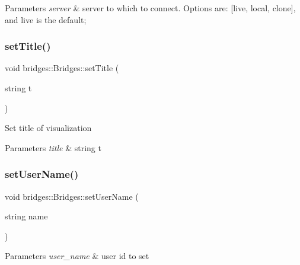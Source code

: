 \begin{DoxyParams}{Parameters}
{\em server} & server to which to connect. Options are\+: \mbox{[}\textquotesingle{}live\textquotesingle{}, \textquotesingle{}local\textquotesingle{}, \textquotesingle{}clone\textquotesingle{}\mbox{]}, and \textquotesingle{}live\textquotesingle{} is the default; \\
\hline
\end{DoxyParams}
\mbox{\label{namespacebridges_1_1_bridges_af36e132d582dabf5ae5ee8b8f26976db}} 
\subsubsection{\texorpdfstring{set\+Title()}{setTitle()}}
{\footnotesize\ttfamily void bridges\+::\+Bridges\+::set\+Title (\begin{DoxyParamCaption}\item[{string}]{t }\end{DoxyParamCaption})}

Set title of visualization


\begin{DoxyParams}{Parameters}
{\em title} & string t \\
\hline
\end{DoxyParams}
\mbox{\label{namespacebridges_1_1_bridges_a383c5c1d3c85541f466e0cb60dde1c29}} 
\subsubsection{\texorpdfstring{set\+User\+Name()}{setUserName()}}
{\footnotesize\ttfamily void bridges\+::\+Bridges\+::set\+User\+Name (\begin{DoxyParamCaption}\item[{string}]{name }\end{DoxyParamCaption})}


\begin{DoxyParams}{Parameters}
{\em user\+\_\+name} & user id to set \\
\hline
\end{DoxyParams}
\mbox{\label{namespacebridges_1_1_bridges_a69aca37ab2729d0345e0549d7baf0423}} 
